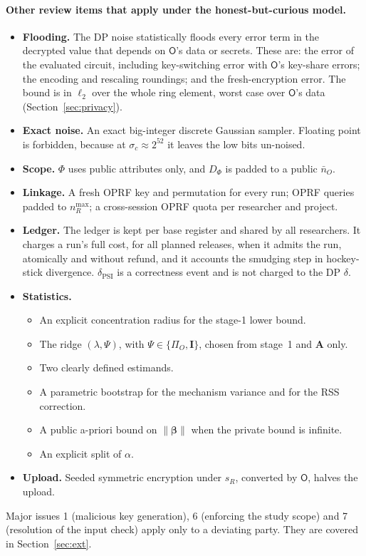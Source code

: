 \documentclass[11pt]{article}
\theoremstyle{definition}
\theoremstyle{plain}
\newcommand{\Op}{\mathsf{O}}
\newcommand{\bA}{\mathbf{A}}
\newcommand{\bI}{\mathbf{I}}
\newcommand{\bbeta}{\boldsymbol{\beta}}
\newcommand{\PiO}{\Pi_O}
\begin{document}
\paragraph{Other review items that apply under the honest-but-curious model.}
\begin{itemize}[nosep]
  \item \textbf{Flooding.} The DP noise statistically floods every error term in the decrypted value that depends on $\Op$'s data or secrets. These are: the error of the evaluated circuit, including key-switching error with $\Op$'s key-share errors; the encoding and rescaling roundings; and the fresh-encryption error. The bound is in $\ell_2$ over the whole ring element, worst case over $\Op$'s data (Section~\ref{sec:privacy}).
  \item \textbf{Exact noise.} An exact big-integer discrete Gaussian sampler. Floating point is forbidden, because at $\sigma_c\approx2^{52}$ it leaves the low bits un-noised.
  \item \textbf{Scope.} $\Phi$ uses public attributes only, and $D_\Phi$ is padded to a public $\bar n_O$.
  \item \textbf{Linkage.} A fresh OPRF key and permutation for every run; OPRF queries padded to $n_R^{\max}$; a cross-session OPRF quota per researcher and project.
  \item \textbf{Ledger.} The ledger is kept per base register and shared by all researchers. It charges a run's full cost, for all planned releases, when it admits the run, atomically and without refund, and it accounts the smudging step in hockey-stick divergence. $\delta_{\mathrm{PSI}}$ is a correctness event and is not charged to the DP $\delta$.
  \item \textbf{Statistics.}
    \begin{itemize}[nosep]
      \item An explicit concentration radius for the stage-1 lower bound.
      \item The ridge $(\lambda,\Psi)$, with $\Psi\in\{\PiO,\bI\}$, chosen from stage~1 and $\bA$ only.
      \item Two clearly defined estimands.
      \item A parametric bootstrap for the mechanism variance and for the RSS correction.
      \item A public a-priori bound on $\|\bbeta\|$ when the private bound is infinite.
      \item An explicit split of $\alpha$.
    \end{itemize}
  \item \textbf{Upload.} Seeded symmetric encryption under $s_R$, converted by $\Op$, halves the upload.
\end{itemize}
Major issues 1 (malicious key generation), 6 (enforcing the study scope) and 7 (resolution of the input check) apply only to a deviating party. They are covered in Section~\ref{sec:ext}.
\end{document}
